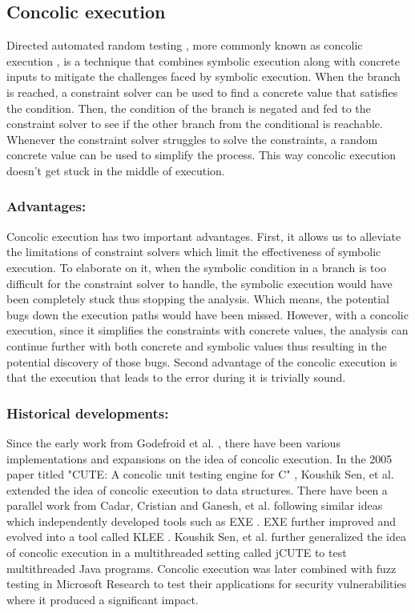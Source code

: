 \documentclass[ runningheads,
               a4paper]{llncs}
\begin{document}
\subsection{Concolic execution}
Directed automated random testing \cite[DART]{godefroid2005dart}, more commonly known as concolic execution \cite{sen2007concolic}, is a technique that combines symbolic execution along with concrete inputs to mitigate the challenges faced by symbolic execution. When the branch is reached, a constraint solver can be used to find a concrete value that satisfies the condition. Then, the condition of the branch is negated and fed to the constraint solver to see if the other branch from the conditional is reachable. Whenever the constraint solver struggles to solve the constraints, a random concrete value can be used to simplify the process. This way concolic execution doesn't get stuck in the middle of execution.


\subsubsection{Advantages:}
Concolic execution has two important advantages. First, it allows us to alleviate the limitations of constraint solvers which limit the effectiveness of symbolic execution. To elaborate on it, when the symbolic condition in a branch is too difficult for the constraint solver to handle, the symbolic execution would have been completely stuck thus stopping the analysis. Which means, the potential bugs down the execution paths would have been missed. However, with a concolic execution, since it simplifies the constraints with concrete values, the analysis can continue further with both concrete and symbolic values thus resulting in the potential discovery of those bugs. Second advantage of the concolic execution is that the execution that leads to the error during it is trivially sound.


\subsubsection{Historical developments:}
Since the early work from Godefroid et al. \cite{godefroid2005dart}, there have been various implementations and expansions on the idea of concolic execution. In the 2005 paper titled "CUTE: A concolic unit testing engine for C" \cite{sen2005cute}, Koushik Sen, et al. extended the idea of concolic execution to data structures. There have been a parallel work from Cadar, Cristian and Ganesh, et al. following similar ideas which independently developed tools such as EXE \cite{cadar2008exe}. EXE further improved and evolved into a tool called KLEE \cite{cadar2008klee}.  Koushik Sen, et al. further generalized the idea of concolic execution in a multithreaded setting called jCUTE \cite{sen2006cute} to test multithreaded Java programs. Concolic execution was later combined with fuzz testing \cite{godefroid2008automated} in Microsoft Research \cite[SAGE]{godefroid2012sage} to test their applications for security vulnerabilities where it produced a significant impact.
\end{document}
